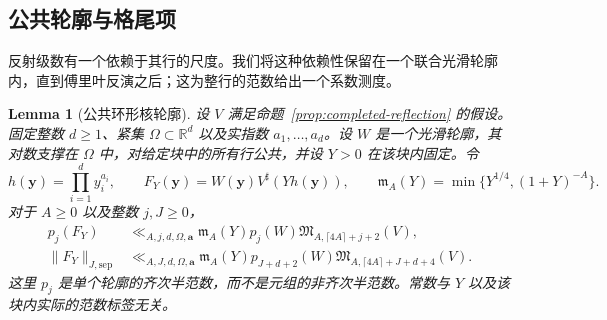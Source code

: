 \documentclass[11pt,a4paper]{article}
\numberwithin{equation}{section}
\numberwithin{figure}{section}
\newtheorem{lemma}[theorem]{Lemma}
\theoremstyle{definition}
\theoremstyle{remark}
\begin{document}
\subsection{公共轮廓与格尾项}

反射级数有一个依赖于其行的尺度。我们将这种依赖性保留在一个联合光滑轮廓内，直到傅里叶反演之后；这为整行的范数给出一个系数测度。

\begin{lemma}[公共环形核轮廓]
\label{lem:reflection-common-profile}
设 $V$ 满足命题~\ref{prop:completed-reflection} 的假设。
固定整数 $d\ge1$、紧集 $\Omega\subset\mathbb R^d$ 以及实指数 $a_1,\ldots,a_d$。设 $W$ 是一个光滑轮廓，其对数支撑在 $\Omega$ 中，对给定块中的所有行公共，并设 $Y>0$ 在该块内固定。令
\[
 h(\boldsymbol y)=\prod_{i=1}^d y_i^{a_i},\qquad
 F_Y(\boldsymbol y)=W(\boldsymbol y)V^\sharp(Yh(\boldsymbol y)),\qquad
 \mathfrak m_A(Y)=\min\{Y^{1/4},(1+Y)^{-A}\}.
\]
对于 $A\ge0$ 以及整数 $j,J\ge0$，
\begin{align}
 p_j(F_Y)&\ll_{A,j,d,\Omega,\boldsymbol a}
 \mathfrak m_A(Y)p_j(W)
 \mathfrak M_{A,\lceil4A\rceil+j+2}(V),
 \label{eq:reflection-common-profile}\\
 \|F_Y\|_{J,\mathrm{sep}}&\ll_{A,J,d,\Omega,\boldsymbol a}
 \mathfrak m_A(Y)p_{J+d+2}(W)
 \mathfrak M_{A,\lceil4A\rceil+J+d+4}(V).
 \label{eq:reflection-common-measure}
\end{align}
这里 $p_j$ 是单个轮廓的齐次半范数，而不是元组的非齐次半范数。常数与 $Y$ 以及该块内实际的范数标签无关。
\end{lemma}
\end{document}
